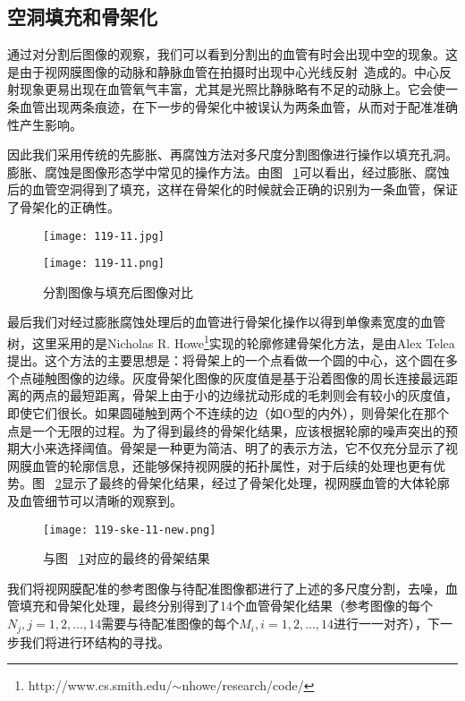 \subsection{空洞填充和骨架化}
通过对分割后图像的观察，我们可以看到分割出的血管有时会出现中空的现象。这是由于视网膜图像的动脉和静脉血管在拍摄时出现中心光线反射~\cite{hari}造成的。中心反射现象更易出现在血管氧气丰富，尤其是光照比静脉略有不足的动脉上。它会使一条血管出现两条痕迹，在下一步的骨架化中被误认为两条血管，从而对于配准准确性产生影响。

因此我们采用传统的先膨胀、再腐蚀方法对多尺度分割图像进行操作以填充孔洞。膨胀、腐蚀是图像形态学中常见的操作方法。由图 ~\ref{ske-fill}可以看出，经过膨胀、腐蚀后的血管空洞得到了填充，这样在骨架化的时候就会正确的识别为一条血管，保证了骨架化的正确性。
   \begin{figure}[ht!]
   \centering
 \begin{minipage}{0.45\linewidth}
  \centering
  \texttt{[image: 119-11.jpg]}
\end{minipage}
\begin{minipage}{0.45\linewidth}
  \centering
  \texttt{[image: 119-11.png]}
\end{minipage}
  \caption{分割图像与填充后图像对比}
    \label{ske-fill}
 \end{figure}
最后我们对经过膨胀腐蚀处理后的血管进行骨架化操作以得到单像素宽度的血管树，这里采用的是Nicholas R. Howe\footnote{http://www.cs.smith.edu/$\sim$nhowe/research/code/}实现的轮廓修建骨架化方法，是由Alex Telea提出。这个方法的主要思想是：将骨架上的一个点看做一个圆的中心，这个圆在多个点碰触图像的边缘。灰度骨架化图像的灰度值是基于沿着图像的周长连接最远距离的两点的最短距离，骨架上由于小的边缘扰动形成的毛刺则会有较小的灰度值，即使它们很长。如果圆碰触到两个不连续的边（如O型的内外），则骨架化在那个点是一个无限的过程。为了得到最终的骨架化结果，应该根据轮廓的噪声突出的预期大小来选择阈值。骨架是一种更为简洁、明了的表示方法，它不仅充分显示了视网膜血管的轮廓信息，还能够保持视网膜的拓扑属性，对于后续的处理也更有优势。图 ~\ref{ske}显示了最终的骨架化结果，经过了骨架化处理，视网膜血管的大体轮廓及血管细节可以清晰的观察到。
    \begin{figure}[ht!]
   \centering
  \texttt{[image: 119-ske-11-new.png]}
  \caption{与图  ~\ref{ske-fill}对应的最终的骨架结果}
    \label{ske}
 \end{figure}
 
 我们将视网膜配准的参考图像与待配准图像都进行了上述的多尺度分割，去噪，血管填充和骨架化处理，最终分别得到了14个血管骨架化结果（参考图像的每个$N_j,j=1,2,\ldots,14$需要与待配准图像的每个$M_i,i=1,2,\ldots,14$进行一一对齐），下一步我们将进行环结构的寻找。
 
